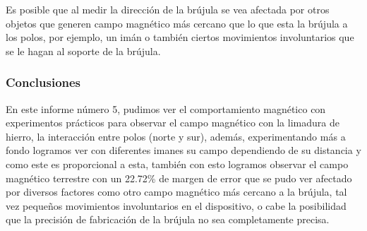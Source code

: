 Es posible que al medir la dirección de la brújula se vea afectada por otros
objetos que generen campo magnético más cercano que lo que esta la brújula a los
polos, por ejemplo, un imán o también ciertos movimientos involuntarios que se
le hagan al soporte de la brújula.


\subsubsection{Conclusiones}
En este informe número 5, pudimos ver el comportamiento magnético con
experimentos prácticos para observar el campo magnético con la limadura de
hierro, la interacción entre polos (norte y sur), además, experimentando más a fondo
logramos ver con diferentes imanes su campo dependiendo de su distancia y como
este es proporcional a esta, también con esto logramos observar el campo
magnético terrestre con un 22.72\% de margen de error que se pudo ver afectado por
diversos factores como otro campo magnético más cercano a la brújula, tal vez
pequeños movimientos involuntarios en el dispositivo, o cabe la posibilidad que
la precisión de fabricación de la brújula no sea completamente precisa.
